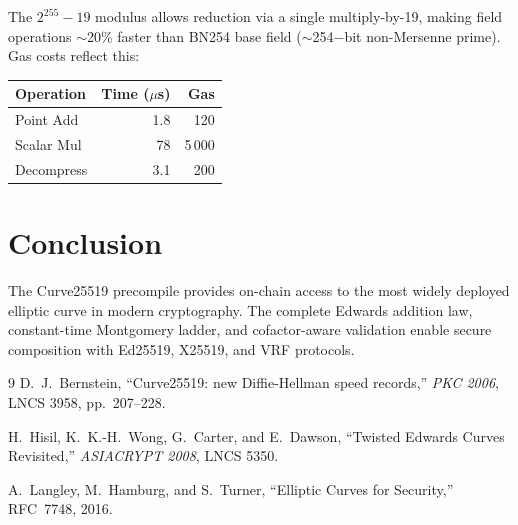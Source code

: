 \documentclass[11pt,a4paper]{article}
\begin{document}
The $2^{255}-19$ modulus allows reduction via a single multiply-by-19, making
field operations $\sim$20\% faster than BN254 base field ($\sim$254$-$bit
non-Mersenne prime). Gas costs reflect this:

\begin{table}[H]
\centering
\begin{tabular}{lrr}
\toprule
\textbf{Operation} & \textbf{Time ($\mu$s)} & \textbf{Gas} \\
\midrule
Point Add & 1.8 & 120 \\
Scalar Mul & 78 & 5\,000 \\
Decompress & 3.1 & 200 \\
\bottomrule
\end{tabular}
\end{table}

\section{Conclusion}

The Curve25519 precompile provides on-chain access to the most widely deployed
elliptic curve in modern cryptography. The complete Edwards addition law,
constant-time Montgomery ladder, and cofactor-aware validation enable secure
composition with Ed25519, X25519, and VRF protocols.

\begin{thebibliography}{9}
  D.~J.~Bernstein, ``Curve25519: new Diffie-Hellman speed records,''
  \textit{PKC 2006}, LNCS 3958, pp.~207--228.

  H.~Hisil, K.~K.-H.~Wong, G.~Carter, and E.~Dawson,
  ``Twisted Edwards Curves Revisited,'' \textit{ASIACRYPT 2008}, LNCS 5350.

  A.~Langley, M.~Hamburg, and S.~Turner, ``Elliptic Curves for Security,''
  RFC~7748, 2016.
\end{thebibliography}
\end{document}
